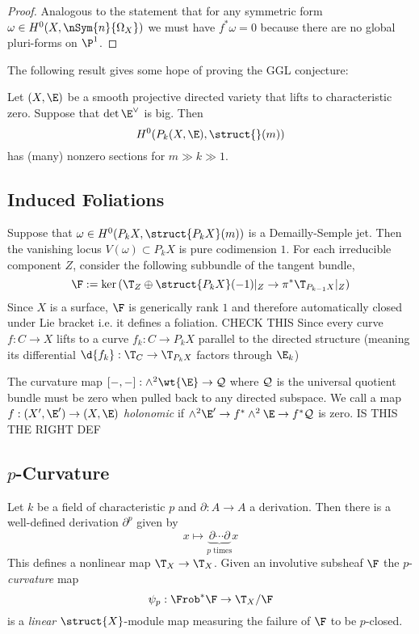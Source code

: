 \documentclass[12pt]{article}
\begin{document}
\begin{proof}
Analogous to the statement that for any symmetric form $\omega \in H^0(X, \nSym{n}{\Omega_X})$ we must have $f^* \omega = 0$ because there are no global pluri-forms on $\P^1$.
\end{proof}

The following result gives some hope of proving the GGL conjecture:

\begin{theorem}
Let $(X, \E)$ be a smooth projective directed variety that lifts to characteristic zero. Suppose that $\det{\E^\vee}$ is big. Then
\[ H^0(P_k(X, \E), \struct{}(m)) \]
has (many) nonzero sections for $m \gg k \gg 1$.
\end{theorem}

\subsection{Induced Foliations}

Suppose that $\omega \in H^0(P_k X, \struct{P_k X}(m))$ is a Demailly-Semple jet. Then the vanishing locus $V(\omega) \subset P_k X$ is pure codimension $1$. For each irreducible component $Z$, consider the following subbundle of the tangent bundle,
\[ \F := \ker{(\T_Z \oplus \struct{P_k X}(-1)|_Z \to \pi^* \T_{P_{k-1}X} |_Z)} \]
Since $X$ is a surface, $\F$ is generically rank $1$ and therefore automatically closed under Lie bracket i.e. it defines a foliation. {\color{red} CHECK THIS} Since every curve $f : C \to X$ lifts to a curve $f_k : C \to P_k X$ parallel to the directed structure (meaning its differential $\d{f_k} : \T_C \to \T_{P_k X}$ factors through $\E_k$)

\begin{rmk}
The curvature map $[-,-] : \wedge^2 \wt{\E} \to \cQ$ where $\mathcal{Q}$ is the universal quotient bundle must be zero when pulled back to any directed subspace. We call a map $f : (X', \E') \to (X, \E)$ \textit{holonomic} if $\wedge^2 \E' \to f^* \wedge^2 \E \to f^* \cQ$ is zero. {\color{red} IS THIS THE RIGHT DEF}
\end{rmk}


\subsection{$p$-Curvature}

\begin{defn}
Let $k$ be a field of characteristic $p$ and $\partial : A \to A$ a derivation. Then there is a well-defined derivation $\partial^p$ given by 
\[ x \mapsto \underbrace{\partial \cdots \partial}_{p \text{ times}} x \]
This defines a nonlinear map $\T_X \to \T_X$. Given an involutive subsheaf $\F$ the $p$-\textit{curvature} map 
\[ \psi_p : \Frob^* \F \to \T_X / \F \]
is a \textit{linear} $\struct{X}$-module map measuring the failure of $\F$ to be $p$-closed.
\end{defn}
\end{document}
